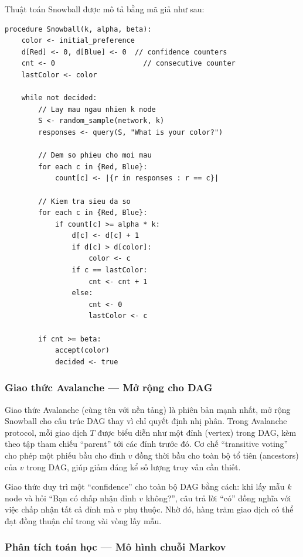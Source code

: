 Thuật toán Snowball được mô tả bằng mã giả như sau:

\begin{lstlisting}[caption={Thuật toán Snowball (mã giả)}, label={lst:snowball}]
procedure Snowball(k, alpha, beta):
    color <- initial_preference
    d[Red] <- 0, d[Blue] <- 0  // confidence counters
    cnt <- 0                     // consecutive counter
    lastColor <- color

    while not decided:
        // Lay mau ngau nhien k node
        S <- random_sample(network, k)
        responses <- query(S, "What is your color?")

        // Dem so phieu cho moi mau
        for each c in {Red, Blue}:
            count[c] <- |{r in responses : r == c}|

        // Kiem tra sieu da so
        for each c in {Red, Blue}:
            if count[c] >= alpha * k:
                d[c] <- d[c] + 1
                if d[c] > d[color]:
                    color <- c
                if c == lastColor:
                    cnt <- cnt + 1
                else:
                    cnt <- 0
                    lastColor <- c

        if cnt >= beta:
            accept(color)
            decided <- true
\end{lstlisting}

\subsubsection{Giao thức Avalanche --- Mở rộng cho DAG}

Giao thức Avalanche (cùng tên với nền tảng) là phiên bản mạnh nhất, mở rộng Snowball cho cấu trúc DAG thay vì chỉ quyết định nhị phân. Trong Avalanche protocol, mỗi giao dịch $T$ được biểu diễn như một đỉnh (vertex) trong DAG, kèm theo tập tham chiếu ``parent'' tới các đỉnh trước đó. Cơ chế ``transitive voting'' cho phép một phiếu bầu cho đỉnh $v$ đồng thời bầu cho toàn bộ tổ tiên (ancestors) của $v$ trong DAG, giúp giảm đáng kể số lượng truy vấn cần thiết.

Giao thức duy trì một ``confidence'' cho toàn bộ DAG bằng cách: khi lấy mẫu $k$ node và hỏi ``Bạn có chấp nhận đỉnh $v$ không?'', câu trả lời ``có'' đồng nghĩa với việc chấp nhận tất cả đỉnh mà $v$ phụ thuộc. Nhờ đó, hàng trăm giao dịch có thể đạt đồng thuận chỉ trong vài vòng lấy mẫu.

\subsubsection{Phân tích toán học --- Mô hình chuỗi Markov}


